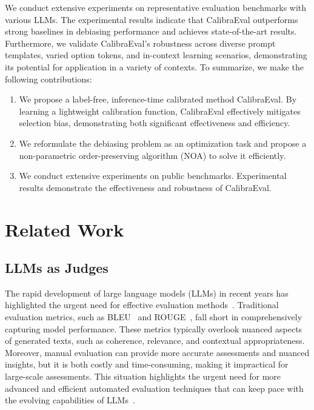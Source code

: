 \documentclass[sigconf]{acmart}
\begin{document}
We conduct extensive experiments on representative evaluation benchmarks with various LLMs. The experimental results indicate that CalibraEval outperforms strong baselines in debiasing performance and achieves state-of-the-art results. Furthermore, we validate CalibraEval's robustness across diverse prompt templates, varied option tokens, and in-context learning scenarios, demonstrating its potential for application in a variety of contexts.
To summarize, we make the following contributions: 

\begin{enumerate} 
\item We propose a label-free, inference-time calibrated method CalibraEval. By learning a lightweight calibration function, CalibraEval effectively mitigates selection bias, demonstrating both significant effectiveness and efficiency.
\item We reformulate the debiasing problem as an optimization task and propose a non-parametric order-preserving algorithm (NOA) to solve it efficiently.
\item We conduct extensive experiments on public benchmarks. Experimental results demonstrate the effectiveness and robustness of CalibraEval.
\end{enumerate}



\section{Related Work}

\subsection{LLMs as Judges}
The rapid development of large language models (LLMs) in recent years has highlighted the urgent need for effective evaluation methods~\cite{shi2024judging,wei2024unveiling,Sailer,chen2024automaticcostefficientpeerreviewframework}. 
Traditional evaluation metrics, such as BLEU~\cite{papineni2002bleu} and ROUGE~\cite{lin2004rouge}, fall short in comprehensively capturing model performance. 
These metrics typically overlook nuanced aspects of generated texts, such as coherence, relevance, and contextual appropriateness.
Moreover, manual evaluation can provide more accurate assessments and nuanced insights, but it is both costly and time-consuming, making it impractical for large-scale assessments. 
This situation highlights the urgent need for more advanced and efficient automated evaluation techniques that can keep pace with the evolving capabilities of LLMs~\cite{chu2024prepeerreviewbased,T2ranking,Lecardv2,li2024lexevalcomprehensivechineselegal}.
\end{document}
